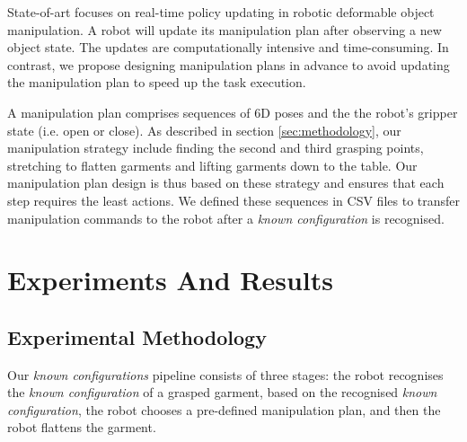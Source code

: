 \documentclass[conference]{IEEEtran}
\begin{document}

State-of-art focuses on real-time policy updating in robotic deformable object manipulation. A robot will update its manipulation plan after observing a new object state. The updates are computationally intensive and time-consuming. In contrast, we propose designing manipulation plans in advance to avoid updating the manipulation plan to speed up the task execution. 

A manipulation plan comprises sequences of 6D poses and the the robot's gripper state (i.e. open or close). As described in section \ref{sec:methodology}, our manipulation strategy include finding the second and third grasping points, stretching to flatten garments and lifting garments down to the table. Our manipulation plan design is thus based on these strategy and ensures that each step requires the least actions. We defined these sequences in CSV files to transfer manipulation commands to the robot after a \textit{known configuration} is recognised.

\section{Experiments And Results \label{sec:experiments_and_results}}

\subsection{Experimental Methodology \label{sec:experiment_settings}}

Our \textit{known configurations} pipeline consists of three stages: the robot recognises the \textit{known configuration} of a grasped garment, based on the recognised \textit{known configuration}, the robot chooses a pre-defined manipulation plan, and then the robot flattens the garment.
\end{document}
